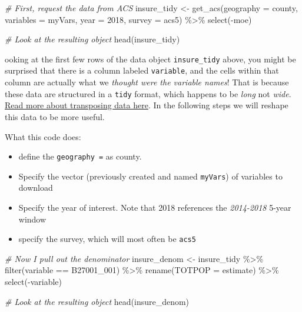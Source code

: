 \documentclass[
]{book}
\newenvironment{Shaded}{\begin{snugshade}}{\end{snugshade}}
\newcommand{\AttributeTok}[1]{\textcolor[rgb]{0.77,0.63,0.00}{#1}}
\newcommand{\CommentTok}[1]{\textcolor[rgb]{0.56,0.35,0.01}{\textit{#1}}}
\newcommand{\DecValTok}[1]{\textcolor[rgb]{0.00,0.00,0.81}{#1}}
\newcommand{\FunctionTok}[1]{\textcolor[rgb]{0.00,0.00,0.00}{#1}}
\newcommand{\NormalTok}[1]{#1}
\newcommand{\OtherTok}[1]{\textcolor[rgb]{0.56,0.35,0.01}{#1}}
\newcommand{\SpecialCharTok}[1]{\textcolor[rgb]{0.00,0.00,0.00}{#1}}
\newcommand{\StringTok}[1]{\textcolor[rgb]{0.31,0.60,0.02}{#1}}
\providecommand{\tightlist}{%
  \setlength{\itemsep}{0pt}\setlength{\parskip}{0pt}}
\newenvironment{rmdwarning}[1]
  {
  \begin{itemize}
  \renewcommand{\labelitemi}{
    \raisebox{-.7\height}[0pt][0pt]{
      {\setkeys{Gin}{width=3em,keepaspectratio}\texttt{[image: images/\#1]}}
    }
  }
  \setlength{\fboxsep}{1em}
  \begin{warning}
  \item
  }
  {
  \end{warning}
  \end{itemize}
  }
\begin{document}
\begin{Shaded}
\begin{Highlighting}[]
\CommentTok{\# First, request the data from ACS}
\NormalTok{insure\_tidy }\OtherTok{\textless{}{-}} \FunctionTok{get\_acs}\NormalTok{(}\AttributeTok{geography =} \StringTok{\textquotesingle{}county\textquotesingle{}}\NormalTok{,}
                     \AttributeTok{variables =}\NormalTok{ myVars,}
                     \AttributeTok{year =} \DecValTok{2018}\NormalTok{, }
                     \AttributeTok{survey =} \StringTok{\textquotesingle{}acs5\textquotesingle{}}\NormalTok{) }\SpecialCharTok{\%\textgreater{}\%}
  \FunctionTok{select}\NormalTok{(}\SpecialCharTok{{-}}\NormalTok{moe)}

\CommentTok{\# Look at the resulting object}
\FunctionTok{head}\NormalTok{(insure\_tidy)}
\end{Highlighting}
\end{Shaded}

\begin{rmdwarning}
Looking at the first few rows of the data object \texttt{insure\_tidy} above, you might be surprised that there is a column labeled \texttt{variable}, and the cells within that column are actually what we \emph{thought were the variable names}! That is because these data are structured in a \texttt{tidy} format, which happens to be \emph{long} not \emph{wide}. \protect\hyperlink{pivot_}{Read more about transposing data here}. In the following steps we will reshape this data to be more useful.

\end{rmdwarning}

What this code does:

\begin{itemize}
\tightlist
\item
  define the \texttt{geography\ =} as county.
\item
  Specify the vector (previously created and named \texttt{myVars}) of variables to download
\item
  Specify the year of interest. Note that 2018 references the \emph{2014-2018} 5-year window
\item
  specify the survey, which will most often be \texttt{acs5}
\end{itemize}

\begin{Shaded}
\begin{Highlighting}[]
\CommentTok{\# Now I pull out the denominator}
\NormalTok{insure\_denom }\OtherTok{\textless{}{-}}\NormalTok{ insure\_tidy }\SpecialCharTok{\%\textgreater{}\%}
  \FunctionTok{filter}\NormalTok{(variable }\SpecialCharTok{==} \StringTok{\textquotesingle{}B27001\_001\textquotesingle{}}\NormalTok{) }\SpecialCharTok{\%\textgreater{}\%}
  \FunctionTok{rename}\NormalTok{(}\AttributeTok{TOTPOP =}\NormalTok{ estimate) }\SpecialCharTok{\%\textgreater{}\%}
  \FunctionTok{select}\NormalTok{(}\SpecialCharTok{{-}}\NormalTok{variable)}

\CommentTok{\# Look at the resulting object}
\FunctionTok{head}\NormalTok{(insure\_denom)}
\end{Highlighting}
\end{Shaded}
\end{document}
